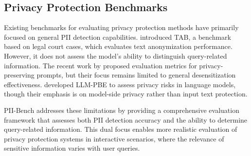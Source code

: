 \subsection{Privacy Protection Benchmarks}
Existing benchmarks for evaluating privacy protection methods have primarily focused on general PII detection capabilities. \citet{pilan2022text} introduced TAB, a benchmark based on legal court cases, which evaluates text anonymization performance. However, it does not assess the model's ability to distinguish query-related information. The recent work by \citet{sun2024deprompt} proposed evaluation metrics for privacy-preserving prompts, but their focus remains limited to general desensitization effectiveness. \citet{li2024llm} developed LLM-PBE to assess privacy risks in language models, though their emphasis is on model-side privacy rather than input text protection.

PII-Bench addresses these limitations by providing a comprehensive evaluation framework that assesses both PII detection accuracy and the ability to determine query-related information. This dual focus enables more realistic evaluation of privacy protection systems in interactive scenarios, where the relevance of sensitive information varies with user queries.

